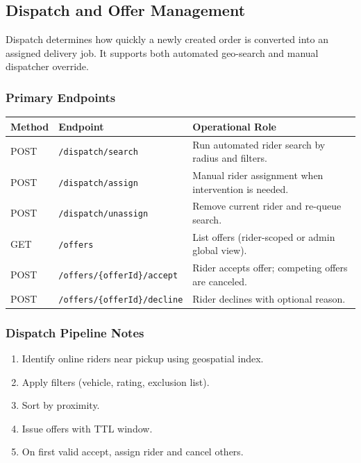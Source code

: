 \subsection{Dispatch and Offer Management}

Dispatch determines how quickly a newly created order is converted into
an assigned delivery job. It supports both automated geo-search and
manual dispatcher override.

\subsubsection{Primary Endpoints}

\begin{tabularx}{\textwidth}{@{}p{2.2cm}p{4.8cm}X@{}}
\toprule
\textbf{Method} & \textbf{Endpoint} & \textbf{Operational Role} \\
\midrule
POST & \texttt{/dispatch/search} & Run automated rider search by radius and filters. \\
POST & \texttt{/dispatch/assign} & Manual rider assignment when intervention is needed. \\
POST & \texttt{/dispatch/unassign} & Remove current rider and re-queue search. \\
GET & \texttt{/offers} & List offers (rider-scoped or admin global view). \\
POST & \texttt{/offers/\{offerId\}/accept} & Rider accepts offer; competing offers are canceled. \\
POST & \texttt{/offers/\{offerId\}/decline} & Rider declines with optional reason. \\
\bottomrule
\end{tabularx}

\subsubsection{Dispatch Pipeline Notes}

\begin{enumerate}
		\item Identify online riders near pickup using geospatial index.
		\item Apply filters (vehicle, rating, exclusion list).
		\item Sort by proximity.
		\item Issue offers with TTL window.
		\item On first valid accept, assign rider and cancel others.
\end{enumerate}

